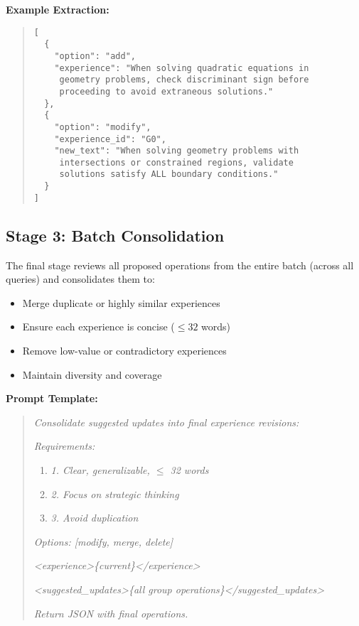 \documentclass[11pt,a4paper]{article}
\begin{document}
\textbf{Example Extraction:}
\begin{quote}
\small
\begin{verbatim}
[
  {
    "option": "add",
    "experience": "When solving quadratic equations in
     geometry problems, check discriminant sign before
     proceeding to avoid extraneous solutions."
  },
  {
    "option": "modify",
    "experience_id": "G0",
    "new_text": "When solving geometry problems with
     intersections or constrained regions, validate
     solutions satisfy ALL boundary conditions."
  }
]
\end{verbatim}
\end{quote}

\subsection{Stage 3: Batch Consolidation}

The final stage reviews all proposed operations from the entire batch (across all queries) and consolidates them to:
\begin{itemize}
    \item Merge duplicate or highly similar experiences
    \item Ensure each experience is concise ($\leq 32$ words)
    \item Remove low-value or contradictory experiences
    \item Maintain diversity and coverage
\end{itemize}

\textbf{Prompt Template:}
\begin{quote}
\small
\textit{Consolidate suggested updates into final experience revisions:}

\textit{Requirements:}
\begin{enumerate}
    \item[] \textit{1. Clear, generalizable, $\leq$ 32 words}
    \item[] \textit{2. Focus on strategic thinking}
    \item[] \textit{3. Avoid duplication}
\end{enumerate}

\textit{Options: [modify, merge, delete]}

\textit{<experience>\{current\}</experience>}

\textit{<suggested\_updates>\{all group operations\}</suggested\_updates>}

\textit{Return JSON with final operations.}
\end{quote}
\end{document}
